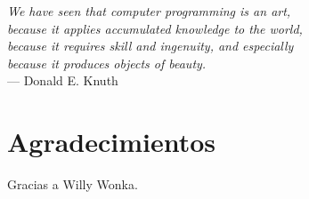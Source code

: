 
\begin{flushright}{\slshape
    We have seen that computer programming is an art, \\
    because it applies accumulated knowledge to the world, \\
    because it requires skill and ingenuity, and especially \\
    because it produces objects of beauty.} \\ \medskip
    --- Donald E. Knuth
\end{flushright}



\bigskip

\begingroup
\let\clearpage\relax
\let\cleardoublepage\relax
\let\cleardoublepage\relax
\chapter*{Agradecimientos}

Gracias a Willy Wonka.

\bigskip


\endgroup

